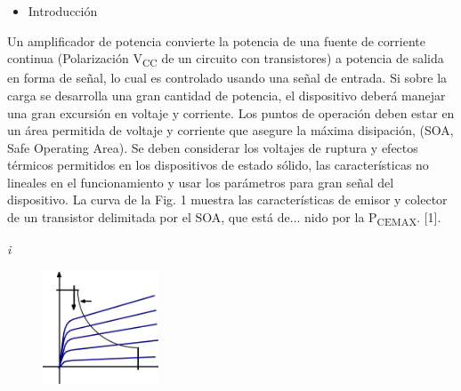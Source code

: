 \documentclass[12pt]{article}
\begin{document}
\vspace{\baselineskip}
\begin{itemize}
	\item {\fontsize{14pt}{16.8pt}\selectfont \textcolor[HTML]{5C2D91}{Introducción}\par}
\end{itemize}\par


\vspace{\baselineskip}
\begin{adjustwidth}{0.86in}{0.88in}
\begin{justify}
{\fontsize{9pt}{10.8pt}\selectfont Un amplificador de potencia convierte la potencia de una fuente de corriente continua (Polarización V\textsubscript{CC} de un circuito con transistores) a potencia de salida en forma de señal, lo cual es controlado usando una señal de entrada. Si sobre la carga se desarrolla una gran cantidad de potencia, el dispositivo deberá manejar una gran excursión en voltaje y corriente. Los puntos de operación deben estar en un área permitida de voltaje y corriente que asegure la máxima disipación, (SOA, Safe Operating Area). Se deben considerar los voltajes de ruptura y efectos térmicos permitidos en los dispositivos de estado sólido, las características no lineales en el funcionamiento y usar los parámetros para gran señal del dispositivo. La curva de la Fig. 1 muestra las características de emisor y colector de un transistor delimitada por el SOA, que está de$ \ldots $ nido por la P\textsubscript{CEMAX}. [1].\par}
\end{justify}\par

\end{adjustwidth}


\vspace{\baselineskip}
\begin{adjustwidth}{2.56in}{0.0in}
{\fontsize{4pt}{4.8pt}\selectfont \textit{i}\par}\par

\end{adjustwidth}




\begin{figure}[H]
\advance\leftskip 2.48in		\includegraphics[width=1.36in,height=1.32in]{./media/image1.png}
\end{figure}
\end{document}
